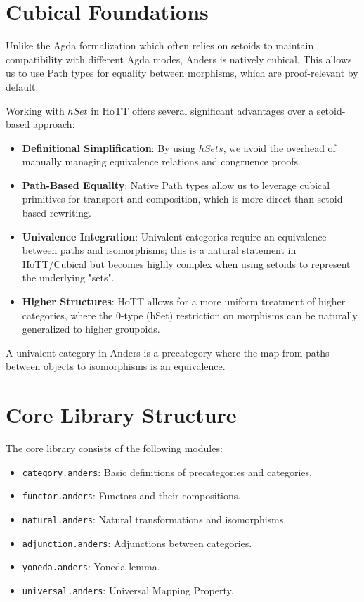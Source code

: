 \documentclass[11pt]{article}
\begin{document}
\newpage
\section{Cubical Foundations}

Unlike the Agda formalization which often relies on setoids to maintain compatibility with different Agda modes,
Anders is natively cubical. This allows us to use Path types for equality between morphisms, which are
proof-relevant by default.

Working with $hSet$ in HoTT offers several significant advantages over a setoid-based approach:

\begin{itemize}
    \item \textbf{Definitional Simplification}: By using $hSets$, we avoid the overhead of manually managing equivalence relations and congruence proofs.
    \item \textbf{Path-Based Equality}: Native Path types allow us to leverage cubical primitives for transport and composition, which is more direct than setoid-based rewriting.
    \item \textbf{Univalence Integration}: Univalent categories require an equivalence between paths and isomorphisms; this is a natural statement in HoTT/Cubical but becomes highly complex when using setoids to represent the underlying "sets".
    \item \textbf{Higher Structures}: HoTT allows for a more uniform treatment of higher categories, where the 0-type (hSet) restriction on morphisms can be naturally generalized to higher groupoids.
\end{itemize}

A univalent category in Anders is a precategory where the map from paths between
objects to isomorphisms is an equivalence.

\section{Core Library Structure}

The core library consists of the following modules:
\begin{itemize}
    \item \texttt{category.anders}: Basic definitions of precategories and categories.
    \item \texttt{functor.anders}: Functors and their compositions.
    \item \texttt{natural.anders}: Natural transformations and isomorphisms.
    \item \texttt{adjunction.anders}: Adjunctions between categories.
    \item \texttt{yoneda.anders}: Yoneda lemma.
    \item \texttt{universal.anders}: Universal Mapping Property.
\end{itemize}
\end{document}
